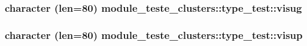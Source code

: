 \subsubsection[{visug}]{\setlength{\rightskip}{0pt plus 5cm}character (len=80) module\+\_\+teste\+\_\+clusters\+::type\+\_\+test\+::visug}\label{structmodule__teste__clusters_1_1type__test_a44e54c0ee5ae01a2234a6b9e6d7758b6}
\hypertarget{structmodule__teste__clusters_1_1type__test_a4f64d7525145220b6e3e94580d2033dc}{}
\subsubsection[{visup}]{\setlength{\rightskip}{0pt plus 5cm}character (len=80) module\+\_\+teste\+\_\+clusters\+::type\+\_\+test\+::visup}\label{structmodule__teste__clusters_1_1type__test_a4f64d7525145220b6e3e94580d2033dc}
